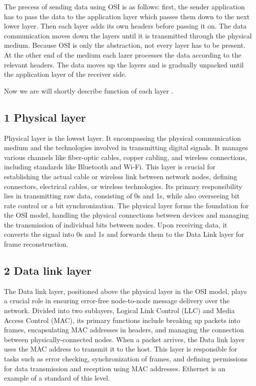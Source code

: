 \documentclass[conference]{IEEEtran}
\begin{document}
The precess of sending data using OSI is as follows: first, the sender application has to pass the data to the application layer which passes them down to the next lower layer. Then each layer adds its own headers before passing it on. The data communication moves down the layers until it is transmitted through the physical medium. Because OSI is only the abstraction, not every layer has to be present. At the other end of the medium each lazer processes the data according to the relevant headers.  The data moves up the layers and is gradually unpacked until the application layer of the receiver side.\cite{AWS-Amazon}

Now we are will shortly describe function of each layer \cite{impreva-osi, geeks-osi}.
\subsection{1 Physical layer}
Physical layer is the lowest layer. It encompassing the physical communication medium and the technologies involved in transmitting digital signals. It manages various channels like fiber-optic cables, copper cabling, and wireless connections, including standards like Bluetooth and Wi-Fi. This layer is crucial for establishing the actual cable or wireless link between network nodes, defining connectors, electrical cables, or wireless technologies. Its primary responsibility lies in transmitting raw data, consisting of 0s and 1s, while also overseeing bit rate control or a bit synchronization. The physical layer forms the foundation for the OSI model, handling the physical connections between devices and managing the transmission of individual bits between nodes. Upon receiving data, it converts the signal into 0s and 1s and forwards them to the Data Link layer for frame reconstruction.

\subsection{2 Data link layer}
The Data link layer, positioned above the physical layer in the OSI model, plays a crucial role in ensuring error-free node-to-node message delivery over the network. Divided into two sublayers, Logical Link Control (LLC) and Media Access Control (MAC), its primary functions include breaking up packets into frames, encapsulating MAC addresses in headers, and managing the connection between physically-connected nodes. When a packet arrives, the Data link layer uses the MAC address to transmit it to the host. This layer is responsible for tasks such as error checking, synchronization of frames, and defining permissions for data transmission and reception using MAC addresses. Ethernet is an example of a standard of this level.
\end{document}
